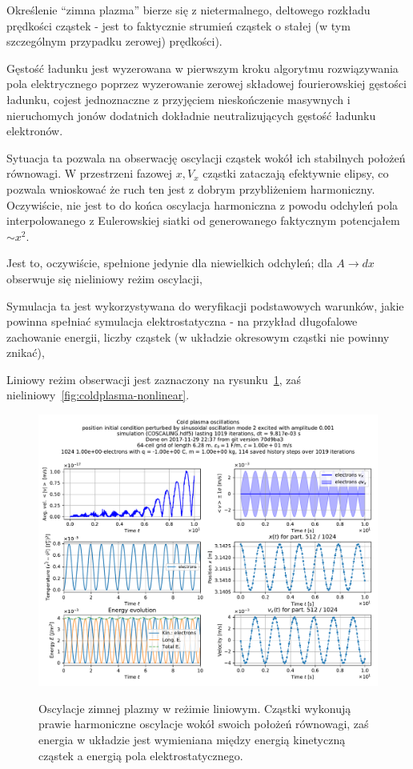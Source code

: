 Określenie ``zimna plazma'' bierze się z nietermalnego, deltowego
rozkładu prędkości cząstek - jest to faktycznie strumień cząstek o stałej
(w tym szczególnym przypadku zerowej) prędkości).

Gęstość ładunku jest wyzerowana w pierwszym kroku algorytmu rozwiązywania pola elektrycznego
poprzez wyzerowanie zerowej składowej fourierowskiej gęstości ładunku, cojest jednoznaczne
z przyjęciem nieskończenie masywnych i nieruchomych jonów dodatnich dokładnie neutralizujących gęstość
ładunku elektronów.

Sytuacja ta
pozwala na obserwację oscylacji cząstek wokół ich stabilnych położeń
równowagi. W przestrzeni fazowej $x, V_x$ cząstki zataczają efektywnie
elipsy, co pozwala wnioskować że ruch ten jest z dobrym przybliżeniem harmoniczny.
Oczywiście, nie jest to do końca oscylacja harmoniczna z powodu odchyleń pola interpolowanego
z Eulerowskiej siatki od generowanego faktycznym potencjałem $ \sim x^2 $.

Jest to, oczywiście, spełnione jedynie dla niewielkich odchyleń; dla $A \to
dx$ obserwuje się nieliniowy reżim oscylacji, 

Symulacja ta jest wykorzystywana do weryfikacji podstawowych warunków, jakie powinna spełniać
symulacja elektrostatyczna - na przykład długofalowe zachowanie energii, liczby cząstek (w układzie okresowym cząstki nie powinny
znikać), %

Liniowy reżim obserwacji jest zaznaczony na rysunku~\ref{fig:coldplasma-linear}, zaś nieliniowy~\ref{fig:coldplasma-nonlinear}.

\begin{figure}[h!]
  \includegraphics[width=\textwidth]{Images/COSCALING}
  \label{fig:coldplasma-linear}
  \caption{Oscylacje zimnej plazmy w reżimie liniowym. Cząstki wykonują prawie harmoniczne oscylacje wokół swoich położeń równowagi, zaś energia
    w układzie jest wymieniana między energią kinetyczną cząstek a energią pola elektrostatycznego.}
\end{figure}

